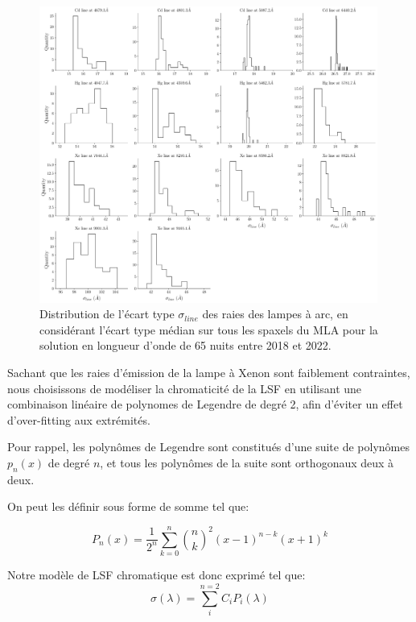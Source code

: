 \documentclass[../main/main.tex]{subfiles}
\begin{document}
\begin{figure}[h!]
  \centering
  \includegraphics[width=0.99\textwidth]{../figures/06_irf/linestd.pdf}
  \caption[Distribution de l'écart type $\sigma_{line}$ des raies des
  lampes à arc]{Distribution de l'écart type $\sigma_{line}$ des raies
    des lampes à arc, en
    considérant l'écart type médian sur tous les spaxels du MLA pour la
    solution en longueur d'onde de 65 nuits entre 2018 et 2022.}
  \label{fig:linestd}
\end{figure}

Sachant que les raies d'émission de la lampe à Xenon sont faiblement
contraintes, nous choisissons de modéliser la chromaticité de la LSF en
utilisant une combinaison linéaire de polynomes de Legendre de degré 2, afin d'éviter un effet
d'over-fitting aux extrémités.

Pour rappel, les polynômes de Legendre sont
constitués d'une suite de polynômes $p_{n}(x)$ de degré
$n$, et tous les polynômes de la suite sont orthogonaux deux à deux.

On peut les définir sous forme de somme tel que:

\begin{equation}
  \label{eq:legendre}
  P_{n}(x)=\frac{1}{2^{n}}\sum\limits^{n}_{k=0}\binom{n}{k}^{2}(x-1)^{n-k}(x+1)^{k}
\end{equation} 

Notre modèle de LSF chromatique est donc exprimé tel que:
\begin{equation}
  \label{eq:lsfmodel}
  \sigma(\lambda)=\sum\limits_{i}^{n=2}C_{i}P_{i}(\lambda)
\end{equation}
\end{document}
